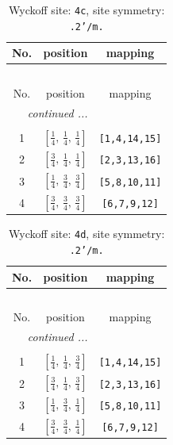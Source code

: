 \documentclass[fleqn,8pt]{jsarticle}
\begin{document}
\renewcommand{\arraystretch}{1.2}
\begin{longtable}{ccc}
\caption{Wyckoff site: {\tt 4c}, site symmetry: {\tt .2'/m.}}
 \\
 \hline \hline
No. & position & mapping \\ \hline \endfirsthead

\multicolumn{2}{l}{\tablename\ \thetable{}} \\
 \hline \hline
No. & position & mapping \\ \hline \endhead

 \hline \hline
\multicolumn{2}{r}{\footnotesize\it continued ...} \\ \endfoot

 \hline \hline
\multicolumn{2}{r}{} \\ \endlastfoot

1 & $\left[ \frac{1}{4},\, \frac{1}{4},\, \frac{1}{4} \right]$ & {\tt [1,4,14,15]} \\ \hline
2 & $\left[ \frac{3}{4},\, \frac{1}{4},\, \frac{1}{4} \right]$ & {\tt [2,3,13,16]} \\ \hline
3 & $\left[ \frac{1}{4},\, \frac{3}{4},\, \frac{3}{4} \right]$ & {\tt [5,8,10,11]} \\ \hline
4 & $\left[ \frac{3}{4},\, \frac{3}{4},\, \frac{3}{4} \right]$ & {\tt [6,7,9,12]} \\
\end{longtable}
\renewcommand{\arraystretch}{1.2}
\begin{longtable}{ccc}
\caption{Wyckoff site: {\tt 4d}, site symmetry: {\tt .2'/m.}}
 \\
 \hline \hline
No. & position & mapping \\ \hline \endfirsthead

\multicolumn{2}{l}{\tablename\ \thetable{}} \\
 \hline \hline
No. & position & mapping \\ \hline \endhead

 \hline \hline
\multicolumn{2}{r}{\footnotesize\it continued ...} \\ \endfoot

 \hline \hline
\multicolumn{2}{r}{} \\ \endlastfoot

1 & $\left[ \frac{1}{4},\, \frac{1}{4},\, \frac{3}{4} \right]$ & {\tt [1,4,14,15]} \\ \hline
2 & $\left[ \frac{3}{4},\, \frac{1}{4},\, \frac{3}{4} \right]$ & {\tt [2,3,13,16]} \\ \hline
3 & $\left[ \frac{1}{4},\, \frac{3}{4},\, \frac{1}{4} \right]$ & {\tt [5,8,10,11]} \\ \hline
4 & $\left[ \frac{3}{4},\, \frac{3}{4},\, \frac{1}{4} \right]$ & {\tt [6,7,9,12]} \\
\end{longtable}
\end{document}
